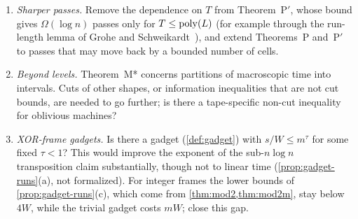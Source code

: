 \begin{enumerate}[label=\arabic*.,leftmargin=2em]
\item \emph{Sharper passes.} Remove the dependence on $T$ from Theorem~P$'$, whose bound gives $\Omega(\log n)$ passes only
for $T\le\operatorname{poly}(L)$ (for example through the run-length lemma of Grohe and Schweikardt~\cite{GroheSchweikardt2005}), and extend Theorems~P and~P$'$ to passes that may move
back by a bounded number of cells.

\item \emph{Beyond levels.} Theorem~M* concerns partitions of macroscopic time into intervals. Cuts of other shapes, or
information inequalities that are not cut bounds, are needed to go further; is there a tape-specific non-cut inequality
for oblivious machines?

\item \emph{XOR-frame gadgets.} Is there a gadget (\cref{def:gadget}) with $s/W\le m^{\tau}$ for some fixed $\tau<1$? This would improve the exponent of the sub-$n\log n$ transposition claim substantially, though not to linear time (\cref{prop:gadget-runs}(a), not formalized). For integer frames the lower bounds of \cref{prop:gadget-runs}(c), which come from \cref{thm:mod2,thm:mod2m}, stay below $4W$, while the trivial gadget costs $mW$; close this gap.
\end{enumerate}
